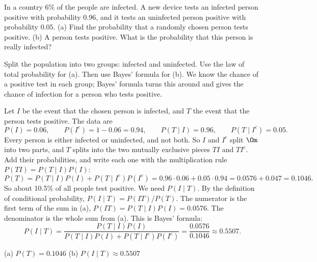
\begin{problem}
	In a country 6\% of the people are infected. A new device tests an
	infected person positive with probability $0.96$, and it tests an
	uninfected person positive with probability $0.05$.
	(a) Find the probability that a randomly chosen person tests positive.
	(b) A person tests positive. What is the probability that this person is
	really infected?
\end{problem}

\begin{solution}
	\idea Split the population into two groups: infected and uninfected. Use
	the law of total probability for (a). Then use Bayes' formula for (b). We
	know the chance of a positive test in each group; Bayes' formula turns this
	around and gives the chance of infection for a person who tests positive.

	Let $I$ be the event that the chosen person is infected, and $T$ the event
	that the person tests positive. The data are
	\[ P(I)=0.06,\qquad P(I^c)=1-0.06=0.94,\qquad P(T\mid I)=0.96,\qquad
		P(T\mid I^c)=0.05. \]
	 Every person is either infected or uninfected, and not both. So
	$I$ and $I^c$ split $\Om$ into two parts, and $T$ splits into the two
	mutually exclusive pieces $TI$ and $TI^c$. Add their probabilities, and
	write each one with the multiplication rule $P(TI)=P(T\mid I)P(I)$:
	\[ P(T)=P(T\mid I)P(I)+P(T\mid I^c)P(I^c)
		=0.96\cdot0.06+0.05\cdot0.94=0.0576+0.047=0.1046. \]
	So about 10.5\% of all people test positive.
	 We need $P(I\mid T)$. By the definition of conditional
	probability, $P(I\mid T)=P(IT)/P(T)$. The numerator is the first term of the
	sum in (a), $P(IT)=P(T\mid I)P(I)=0.0576$. The denominator is the whole
	sum from (a). This is Bayes' formula:
	\[ P(I\mid T)=\frac{P(T\mid I)P(I)}{P(T\mid I)P(I)+P(T\mid I^c)P(I^c)}
		=\frac{0.0576}{0.1046}\approx0.5507. \]
	\begin{answer}
		(a) $P(T)=0.1046$ \quad (b) $P(I\mid T)\approx0.5507$
	\end{answer}
\end{solution}
